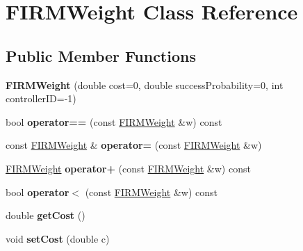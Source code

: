 \hypertarget{class_f_i_r_m_weight}{\section{\-F\-I\-R\-M\-Weight \-Class \-Reference}
\label{class_f_i_r_m_weight}
}
\subsection*{\-Public \-Member \-Functions}
\begin{DoxyCompactItemize}
\item 
\hypertarget{class_f_i_r_m_weight_aaab8a3b391a0d39cbb777a4516433076}{{\bfseries \-F\-I\-R\-M\-Weight} (double cost=0, double success\-Probability=0, int controller\-I\-D=-\/1)}\label{class_f_i_r_m_weight_aaab8a3b391a0d39cbb777a4516433076}

\item 
\hypertarget{class_f_i_r_m_weight_a94ddb9e688e584d239161a2ee85c1085}{bool {\bfseries operator==} (const \hyperlink{class_f_i_r_m_weight}{\-F\-I\-R\-M\-Weight} \&w) const }\label{class_f_i_r_m_weight_a94ddb9e688e584d239161a2ee85c1085}

\item 
\hypertarget{class_f_i_r_m_weight_a8b7c01a43cada364fe0e0f471043bc1d}{const \hyperlink{class_f_i_r_m_weight}{\-F\-I\-R\-M\-Weight} \& {\bfseries operator=} (const \hyperlink{class_f_i_r_m_weight}{\-F\-I\-R\-M\-Weight} \&w)}\label{class_f_i_r_m_weight_a8b7c01a43cada364fe0e0f471043bc1d}

\item 
\hypertarget{class_f_i_r_m_weight_a3b342b0132221bbfa29e6f7eb3478bec}{\hyperlink{class_f_i_r_m_weight}{\-F\-I\-R\-M\-Weight} {\bfseries operator+} (const \hyperlink{class_f_i_r_m_weight}{\-F\-I\-R\-M\-Weight} \&w) const }\label{class_f_i_r_m_weight_a3b342b0132221bbfa29e6f7eb3478bec}

\item 
\hypertarget{class_f_i_r_m_weight_ab7c3de7f284f866bc1dc9a4b123e3c1c}{bool {\bfseries operator$<$} (const \hyperlink{class_f_i_r_m_weight}{\-F\-I\-R\-M\-Weight} \&w) const }\label{class_f_i_r_m_weight_ab7c3de7f284f866bc1dc9a4b123e3c1c}

\item 
\hypertarget{class_f_i_r_m_weight_a4fce79c475a69db5c001cb7771a42e97}{double {\bfseries get\-Cost} ()}\label{class_f_i_r_m_weight_a4fce79c475a69db5c001cb7771a42e97}

\item 
\hypertarget{class_f_i_r_m_weight_a75c60724969c1f443dec6b5817532f63}{void {\bfseries set\-Cost} (double c)}\label{class_f_i_r_m_weight_a75c60724969c1f443dec6b5817532f63}


\end{DoxyCompactItemize}
